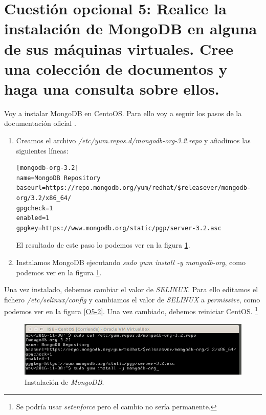 \documentclass[a4paper,titlepage,12pt]{scrartcl}	%
\numberwithin{figure}{section} %
\numberwithin{table}{section} %
\begin{document}
	\section[Cuestión opcional 5: Realice la instalación de MongoDB en alguna de sus máquinas virtuales. Cree una colección de documentos y haga una consulta sobre ellos.]{Cuestión opcional 5: Realice la instalación de MongoDB en alguna de sus máquinas virtuales. Cree una colección de documentos y haga una consulta sobre ellos.}
	
	Voy a instalar MongoDB en CentoOS. Para ello voy a seguir los pasos de la documentación oficial \cite{mongodb}.
	\begin{enumerate}
		\item Creamos el archivo \textit{/etc/yum.repos.d/mongodb-org-3.2.repo} y añadimos las siguientes líneas:
		\begin{lstlisting}[frame=single, xleftmargin=0.5cm, basicstyle=\footnotesize, label={scriptcrontab}]
[mongodb-org-3.2]
name=MongoDB Repository
baseurl=https://repo.mongodb.org/yum/redhat/$releasever/mongodb-org/3.2/x86_64/
gpgcheck=1
enabled=1
gpgkey=https://www.mongodb.org/static/pgp/server-3.2.asc
		\end{lstlisting}
		El resultado de este paso lo podemos ver en la figura \ref{O5-1}.
		\item Instalamos MongoDB ejecutando \textit{sudo yum install -y mongodb-org}, como podemos ver en la figura \ref{O5-1}.
	\end{enumerate}
	
	Una vez instalado, debemos cambiar el valor de \textit{SELINUX}. Para ello editamos el fichero \textit{/etc/selinux/config} y cambiamos el valor de \textit{SELINUX} a \textit{permissive}, como podemos ver en la figura \ref{O5-2}. Una vez cambiado, debemos reiniciar CentOS. \footnote{Se podría usar \textit{setenforce} pero el cambio no sería permanente.} 
	
	\begin{figure}[H]
		\includegraphics[width=\linewidth]{./Imagenes/O5-1.png}
		\vspace{-0.5cm}
		\caption[Instalación de \textit{MongoDB}.]{Instalación de \textit{MongoDB}.}
		\label{O5-1}
	\end{figure}
	
\end{document}
